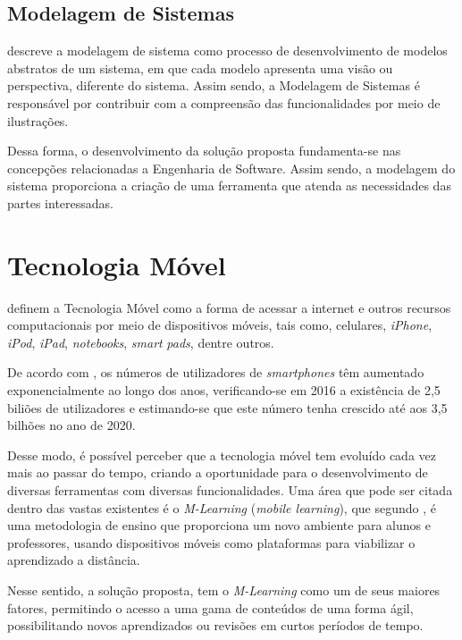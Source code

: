 \subsection{Modelagem de Sistemas}
\label{modelagemDeSistemas}

 descreve a modelagem de sistema como processo de desenvolvimento de modelos abstratos de um sistema, em que cada modelo apresenta uma visão ou perspectiva, diferente do sistema. Assim sendo, a Modelagem de Sistemas é responsável por contribuir com a compreensão das funcionalidades por meio de ilustrações.

Dessa forma, o desenvolvimento da solução proposta fundamenta-se nas concepções relacionadas a Engenharia de Software. Assim sendo, a modelagem do sistema proporciona a criação de uma ferramenta que atenda as necessidades das partes interessadas.

\section{Tecnologia Móvel}
\label{tecnologiaMovel}

 definem a Tecnologia Móvel como a forma de acessar a internet e outros recursos computacionais por meio de dispositivos móveis, tais como, celulares, \textit{iPhone}, \textit{iPod}, \textit{iPad}, \textit{notebooks}, \textit{smart} \textit{pads}, dentre outros.

De acordo com , os números de utilizadores de \textit{smartphones} têm aumentado exponencialmente ao longo dos anos, verificando-se em 2016 a existência de 2,5 biliões de utilizadores e estimando-se que este número tenha crescido até aos 3,5 bilhões no ano de 2020. 

Desse modo, é possível perceber que a tecnologia móvel tem evoluído cada vez mais ao passar do tempo, criando a oportunidade para o desenvolvimento de diversas ferramentas com diversas funcionalidades. Uma área que pode ser citada dentro das vastas existentes é o \textit{M-Learning} (\textit{mobile learning}), que segundo , é uma metodologia de ensino que proporciona um novo ambiente para alunos e professores, usando dispositivos móveis como plataformas para viabilizar o aprendizado a distância.

Nesse sentido, a solução proposta, tem o \textit{M-Learning} como um de seus maiores fatores, permitindo o acesso a uma gama de conteúdos de uma forma ágil, possibilitando novos aprendizados ou revisões em curtos períodos de tempo.


